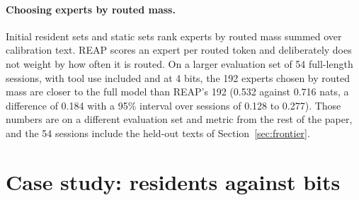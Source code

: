 \documentclass[11pt]{article}
\begin{document}
\paragraph{Choosing experts by routed mass.} Initial resident sets and static sets rank experts
by routed mass summed over calibration text. REAP scores an expert per routed token and
deliberately does not weight by how often it is routed. On a larger evaluation set of 54
full-length sessions, with tool use included and at 4 bits, the 192 experts chosen by routed
mass are closer to the full model than REAP's 192 (0.532 against 0.716 nats, a difference of
0.184 with a 95\% interval over sessions of 0.128 to 0.277). Those numbers are on a different
evaluation set and metric from the rest of the paper, and the 54 sessions include the held-out texts of Section~\ref{sec:frontier}.

\FloatBarrier
\section{Case study: residents against bits}
\label{app:bits}
\end{document}
